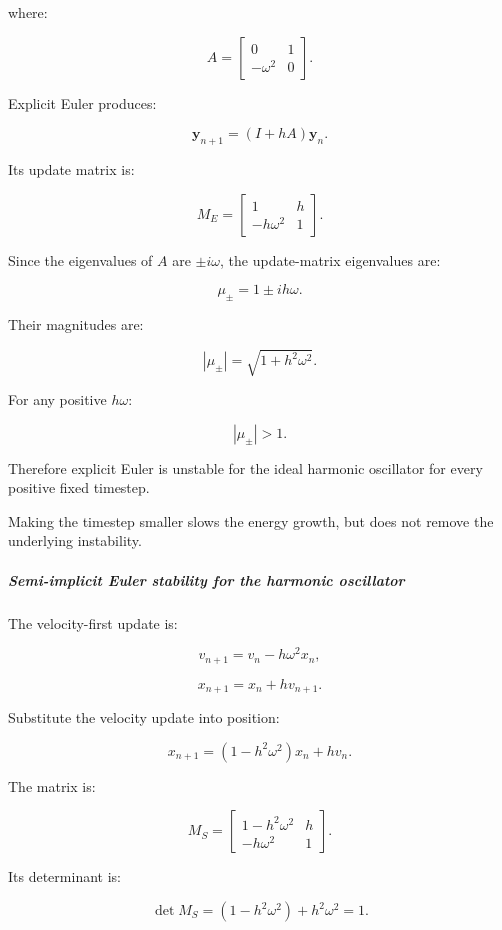 where:

\[
A= \begin{bmatrix} 0&1\\ -\omega^2&0 \end{bmatrix}.
\]

Explicit Euler produces:

\[
\mathbf y_{n+1}=(I+hA)\mathbf y_n.
\]

Its update matrix is:

\[
\boxed{ M_E= \begin{bmatrix} 1&h\\ -h\omega^2&1 \end{bmatrix} }.
\]

Since the eigenvalues of \(A\) are \(\pm i\omega\), the update-matrix eigenvalues are:

\[
\mu_\pm=1\pm ih\omega.
\]

Their magnitudes are:

\[
|\mu_\pm| = \sqrt{1+h^2\omega^2}.
\]

For any positive \(h\omega\):

\[
\boxed{|\mu_\pm|>1}.
\]

Therefore explicit Euler is unstable for the ideal harmonic oscillator for every positive fixed timestep.

Making the timestep smaller slows the energy growth, but does not remove the underlying instability.

\subparagraph{Semi-implicit Euler stability for the harmonic oscillator}\label{02-foundations-ii-ch025-semi-implicit-euler-stability-for-the-harmonic-oscillator}

\hypertarget{02-foundations-ii-ch025-semi-implicit-euler-stability-for-the-harmonic-oscillator}{}

The velocity-first update is:

\[
v_{n+1}=v_n-h\omega^2x_n,
\]

\[
x_{n+1}=x_n+hv_{n+1}.
\]

Substitute the velocity update into position:

\[
x_{n+1} =(1-h^2\omega^2)x_n+hv_n.
\]

The matrix is:

\[
\boxed{ M_S= \begin{bmatrix} 1-h^2\omega^2&h\\ -h\omega^2&1 \end{bmatrix} }.
\]

Its determinant is:

\[
\det M_S =(1-h^2\omega^2)+h^2\omega^2=1.
\]

